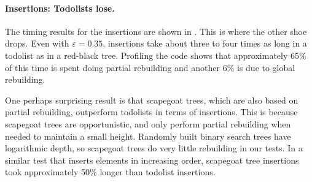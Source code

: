 \documentclass{patmorin}
\newcommand{\eps}{\varepsilon}
\begin{document}
\paragraph{Insertions: Todolists lose.}
The timing results for the insertions are shown in
. This is where the other shoe drops.  Even with
$\eps=0.35$, insertions take about three to four times as long in
a todolist as in a red-black tree.  Profiling the code shows that
approximately 65\% of this time is spent doing partial rebuilding and
another 6\% is due to global rebuilding.

One perhaps surprising result is that scapegoat trees, which are also
based on partial rebuilding, outperform todolists in terms of insertions.
This is because scapegoat trees are opportunistic, and only perform
partial rebuilding when needed to maintain a small height.  Randomly built
binary search trees have logarithmic depth, so scapegoat trees do very
little rebuilding in our tests.  In a similar test that inserts elements
in increasing order, scapegoat tree insertions took approximately 50\%
longer than todolist insertions.
\end{document}
